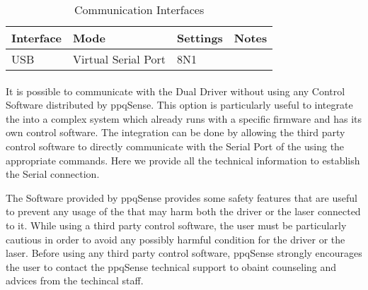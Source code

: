 \begin{table}[H]
    \begin{center}
        \begin{tabular}{
        |p{2cm}
        |>{\centering\arraybackslash}p{4cm}
        |>{\centering\arraybackslash}p{4cm}
        |>{\centering\arraybackslash}p{3cm}
        |  }
        \hline
        \textbf{Interface} & \textbf{Mode} & \textbf{Settings} & \textbf{Notes} \\
         \hline
         USB & Virtual Serial Port & 115200 8N1 & \\
         \hline
        \end{tabular}
    \caption{Communication Interfaces}
    \end{center}
\end{table}


\paragraph{} It is possible to communicate with the Dual Driver without using any Control Software distributed by ppqSense. This option is particularly useful to integrate the \QubeModel  into a complex system which already runs with a specific firmware and has its own control software. The integration can be done by allowing the third party control software to directly communicate with the Serial Port of the \QubeModel  using the appropriate commands.
\newline Here we provide all the technical information to establish the Serial connection.

\begin{tcolorbox}[enhanced,attach boxed title to top center={yshift=-3mm,yshifttext=-1mm},
                    colback=black!5!white, colframe=red!75!black, colbacktitle=red!80!black,
                    title=CAUTION, fonttitle=\bfseries, boxed title style={size=small, 
                    colframe=black!50!black} ]

    The \SoftwareType Software provided by ppqSense provides some safety features that are useful to prevent any usage of the \QubeModel  that may harm both the driver or the laser connected to it.
    \newline While using a third party control software, the user must be particularly cautious in order to avoid any possibly harmful condition for the \QubeModel  driver or the laser.
    \newline Before using any third party control software, ppqSense strongly encourages the user to contact the ppqSense technical support to obaint counseling and advices from the techincal staff.
\end{tcolorbox}




